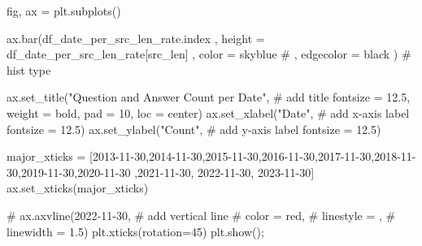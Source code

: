 \documentclass[
  letterpaper,
  DIV=11,
  numbers=noendperiod]{scrartcl}
\newenvironment{Shaded}{\begin{snugshade}}{\end{snugshade}}
\newcommand{\CommentTok}[1]{\textcolor[rgb]{0.37,0.37,0.37}{#1}}
\newcommand{\DecValTok}[1]{\textcolor[rgb]{0.68,0.00,0.00}{#1}}
\newcommand{\FloatTok}[1]{\textcolor[rgb]{0.68,0.00,0.00}{#1}}
\newcommand{\NormalTok}[1]{\textcolor[rgb]{0.00,0.23,0.31}{#1}}
\newcommand{\OperatorTok}[1]{\textcolor[rgb]{0.37,0.37,0.37}{#1}}
\newcommand{\StringTok}[1]{\textcolor[rgb]{0.13,0.47,0.30}{#1}}
\begin{document}
\begin{Shaded}
\begin{Highlighting}[]
\NormalTok{fig, ax }\OperatorTok{=}\NormalTok{ plt.subplots()}

\NormalTok{ax.bar(df\_date\_per\_src\_len\_rate.index}
\NormalTok{    ,  height }\OperatorTok{=}\NormalTok{ df\_date\_per\_src\_len\_rate[}\StringTok{\textquotesingle{}src\_len\textquotesingle{}}\NormalTok{]}
\NormalTok{    ,  color }\OperatorTok{=} \StringTok{\textquotesingle{}skyblue\textquotesingle{}}
    \CommentTok{\# ,  edgecolor = \textquotesingle{}black\textquotesingle{}}
\NormalTok{      ) }\CommentTok{\# hist type}

\NormalTok{ax.set\_title(}\StringTok{"Question and Answer Count per Date"}\NormalTok{, }\CommentTok{\# add title}
\NormalTok{             fontsize }\OperatorTok{=} \FloatTok{12.5}\NormalTok{,}
\NormalTok{             weight }\OperatorTok{=} \StringTok{\textquotesingle{}bold\textquotesingle{}}\NormalTok{,}
\NormalTok{             pad }\OperatorTok{=} \DecValTok{10}\NormalTok{,}
\NormalTok{             loc }\OperatorTok{=} \StringTok{\textquotesingle{}center\textquotesingle{}}\NormalTok{)}
\NormalTok{ax.set\_xlabel(}\StringTok{"Date"}\NormalTok{, }\CommentTok{\# add x{-}axis label}
\NormalTok{              fontsize }\OperatorTok{=} \FloatTok{12.5}\NormalTok{)}
\NormalTok{ax.set\_ylabel(}\StringTok{"Count"}\NormalTok{, }\CommentTok{\# add y{-}axis label}
\NormalTok{              fontsize }\OperatorTok{=} \FloatTok{12.5}\NormalTok{)}

\NormalTok{major\_xticks }\OperatorTok{=}\NormalTok{ [}\StringTok{\textquotesingle{}2013{-}11{-}30\textquotesingle{}}\NormalTok{,}\StringTok{\textquotesingle{}2014{-}11{-}30\textquotesingle{}}\NormalTok{,}\StringTok{\textquotesingle{}2015{-}11{-}30\textquotesingle{}}\NormalTok{,}\StringTok{\textquotesingle{}2016{-}11{-}30\textquotesingle{}}\NormalTok{,}\StringTok{\textquotesingle{}2017{-}11{-}30\textquotesingle{}}\NormalTok{,}\StringTok{\textquotesingle{}2018{-}11{-}30\textquotesingle{}}\NormalTok{,}\StringTok{\textquotesingle{}2019{-}11{-}30\textquotesingle{}}\NormalTok{,}\StringTok{\textquotesingle{}2020{-}11{-}30\textquotesingle{}}
\NormalTok{                ,}\StringTok{\textquotesingle{}2021{-}11{-}30\textquotesingle{}}\NormalTok{, }\StringTok{\textquotesingle{}2022{-}11{-}30\textquotesingle{}}\NormalTok{, }\StringTok{\textquotesingle{}2023{-}11{-}30\textquotesingle{}}\NormalTok{]}
\NormalTok{ax.set\_xticks(major\_xticks)}

\CommentTok{\# ax.axvline(\textquotesingle{}2022{-}11{-}30\textquotesingle{}, \# add vertical line}
\CommentTok{\#            color = \textquotesingle{}red\textquotesingle{},}
\CommentTok{\#            linestyle = \textquotesingle{}{-}{-}\textquotesingle{},}
\CommentTok{\#            linewidth = 1.5)}
\NormalTok{plt.xticks(rotation}\OperatorTok{=}\DecValTok{45}\NormalTok{)}
\NormalTok{plt.show()}\OperatorTok{;}
\end{Highlighting}
\end{Shaded}
\end{document}
